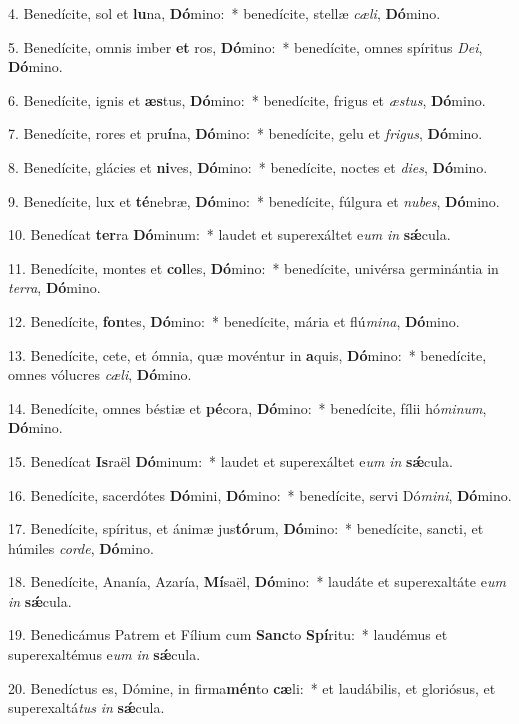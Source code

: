 4. Benedícite, sol et \textbf{lu}na, \textbf{Dó}mino:~* benedícite, stellæ \textit{cæ}\textit{li}, \textbf{Dó}mino.

5. Benedícite, omnis imber \textbf{et} ros, \textbf{Dó}mino:~* benedícite, omnes spíritus \textit{De}\textit{i}, \textbf{Dó}mino.

6. Benedícite, ignis et \textbf{æs}tus, \textbf{Dó}mino:~* benedícite, frigus et \textit{æs}\textit{tus}, \textbf{Dó}mino.

7. Benedícite, rores et pru\textbf{í}na, \textbf{Dó}mino:~* benedícite, gelu et \textit{fri}\textit{gus}, \textbf{Dó}mino.

8. Benedícite, glácies et \textbf{ni}ves, \textbf{Dó}mino:~* benedícite, noctes et \textit{di}\textit{es}, \textbf{Dó}mino.

9. Benedícite, lux et \textbf{té}nebræ, \textbf{Dó}mino:~* benedícite, fúlgura et \textit{nu}\textit{bes}, \textbf{Dó}mino.

10. Benedícat \textbf{ter}ra \textbf{Dó}minum:~* laudet et superexáltet e\textit{um} \textit{in} \textbf{s\'{\ae}}cula.

11. Benedícite, montes et \textbf{col}les, \textbf{Dó}mino:~* benedícite, univérsa germinántia in \textit{ter}\textit{ra}, \textbf{Dó}mino.

12. Benedícite, \textbf{fon}tes, \textbf{Dó}mino:~* benedícite, mária et flú\textit{mi}\textit{na}, \textbf{Dó}mino.

13. Benedícite, cete, et ómnia, quæ movéntur in \textbf{a}quis, \textbf{Dó}mino:~* benedícite, omnes vólucres \textit{cæ}\textit{li}, \textbf{Dó}mino.

14. Benedícite, omnes béstiæ et \textbf{pé}cora, \textbf{Dó}mino:~* benedícite, fílii hó\textit{mi}\textit{num}, \textbf{Dó}mino.

15. Benedícat \textbf{Is}raël \textbf{Dó}minum:~* laudet et superexáltet e\textit{um} \textit{in} \textbf{s\'{\ae}}cula.

16. Benedícite, sacerdótes \textbf{Dó}mini, \textbf{Dó}mino:~* benedícite, servi Dó\textit{mi}\textit{ni}, \textbf{Dó}mino.

17. Benedícite, spíritus, et ánimæ jus\textbf{tó}rum, \textbf{Dó}mino:~* benedícite, sancti, et húmiles \textit{cor}\textit{de}, \textbf{Dó}mino.

18. Benedícite, Ananía, Azaría, \textbf{Mí}saël, \textbf{Dó}mino:~* laudáte et superexaltáte e\textit{um} \textit{in} \textbf{s\'{\ae}}cula.

19. Benedicámus Patrem et Fílium cum \textbf{Sanc}to \textbf{Spí}ritu:~* laudémus et superexaltémus e\textit{um} \textit{in} \textbf{s\'{\ae}}cula.

20. Benedíctus es, Dómine, in firma\textbf{mén}to \textbf{cæ}li:~* et laudábilis, et gloriósus, et superexaltá\textit{tus} \textit{in} \textbf{s\'{\ae}}cula.